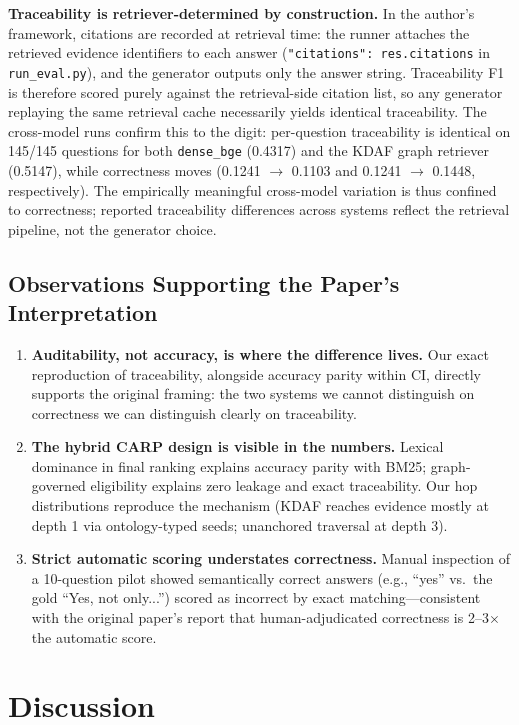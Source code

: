 \documentclass[11pt]{article}
\begin{document}
\textbf{Traceability is retriever-determined by construction.} In the author's framework, citations are recorded at retrieval time: the runner attaches the retrieved evidence identifiers to each answer (\texttt{"citations": res.citations} in \texttt{run\_eval.py}), and the generator outputs only the answer string. Traceability F1 is therefore scored purely against the retrieval-side citation list, so any generator replaying the same retrieval cache necessarily yields identical traceability. The cross-model runs confirm this to the digit: per-question traceability is identical on 145/145 questions for both \texttt{dense\_bge} (0.4317) and the KDAF graph retriever (0.5147), while correctness moves (0.1241 $\to$ 0.1103 and 0.1241 $\to$ 0.1448, respectively). The empirically meaningful cross-model variation is thus confined to correctness; reported traceability differences across systems reflect the retrieval pipeline, not the generator choice.

\subsection{Observations Supporting the Paper's Interpretation}

\begin{enumerate}
\item \textbf{Auditability, not accuracy, is where the difference lives.} Our exact reproduction of traceability, alongside accuracy parity within CI, directly supports the original framing: the two systems we cannot distinguish on correctness we can distinguish clearly on traceability.
\item \textbf{The hybrid CARP design is visible in the numbers.} Lexical dominance in final ranking explains accuracy parity with BM25; graph-governed eligibility explains zero leakage and exact traceability. Our hop distributions reproduce the mechanism (KDAF reaches evidence mostly at depth 1 via ontology-typed seeds; unanchored traversal at depth 3).
\item \textbf{Strict automatic scoring understates correctness.} Manual inspection of a 10-question pilot showed semantically correct answers (e.g., ``yes'' vs.\ the gold ``Yes, not only...'') scored as incorrect by exact matching---consistent with the original paper's report that human-adjudicated correctness is 2--3$\times$ the automatic score.
\end{enumerate}

\section{Discussion}
\end{document}
